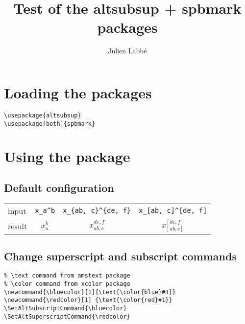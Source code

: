 \documentclass{article}
\title{Test of the \textsf{altsubsup} + \textsf{spbmark} packages}
\author{Julien Labb\'e}
\begin{document}
\maketitle

\renewcommand{\arraystretch}{1.5}

\section{Loading the packages}

\begin{verbatim}
\usepackage{altsubsup}
\usepackage[both]{spbmark}
\end{verbatim}

\section{Using the package}

\subsection{Default configuration}

\begin{center}
  \begin{tabular}{lccc}
    \hline
    input & \verb|x_a^b| & \verb|x_{ab, c}^{de, f}|   & \verb|x_[ab, c]^[de, f]| \\
    result & $x_a^b$ & $x_{ab, c}^{de, f}$  & $x_[ab, c]^[de, f]$ \\
    \hline
  \end{tabular}
\end{center}

\subsection{Change superscript and subscript commands}

\begin{verbatim}
% \text command from amstext package
% \color command from xcolor package
\newcommand{\bluecolor}[1]{\text{\color{blue}#1}}
\newcommand{\redcolor}[1] {\text{\color{red}#1}}
\SetAltSubscriptCommand{\bluecolor}
\SetAltSuperscriptCommand{\redcolor}
\end{verbatim}

\newcommand{\bluecolor}[1]{\text{\color{blue}#1}}
\newcommand{\redcolor}[1] {\text{\color{red}#1}}
\SetAltSubscriptCommand{\bluecolor}
\SetAltSuperscriptCommand{\redcolor}
\end{document}
